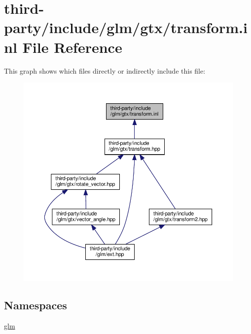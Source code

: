 \hypertarget{transform_8inl}{}\section{third-\/party/include/glm/gtx/transform.inl File Reference}
\label{transform_8inl}
This graph shows which files directly or indirectly include this file\+:
\nopagebreak
\begin{figure}[H]
\begin{center}
\leavevmode
\includegraphics[width=350pt]{transform_8inl__dep__incl}
\end{center}
\end{figure}
\subsection*{Namespaces}
\begin{DoxyCompactItemize}
\item 
 \hyperlink{namespaceglm}{glm}
\end{DoxyCompactItemize}
